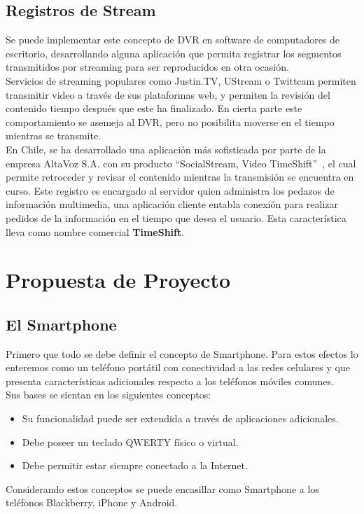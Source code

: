 \subsection{Registros de Stream}

Se puede implementar este concepto de DVR en software de computadores de escritorio, desarrollando alguna aplicación que permita registrar los segmentos transmitidos por streaming para ser reproducidos en otra ocasión. \\

	Servicios de streaming populares como Justin.TV, UStream o Twittcam permiten transmitir video a través de sus plataformas web, y permiten la revisión del contenido tiempo después que este ha finalizado. En cierta parte este comportamiento se asemeja al DVR, pero no posibilita moverse en el tiempo mientras se transmite.\\

En Chile, se ha desarrollado una aplicación más sofisticada por parte de la empresa AltaVoz S.A. con su producto \textquotedblleft SocialStream, Video TimeShift\textquotedblright \ \cite{sota:altavoz-socialstream}, el cual permite retroceder y revisar el contenido mientras la transmisión se encuentra en curso. Este registro es encargado al servidor quien administra los pedazos de información multimedia, una aplicación cliente entabla conexión para realizar pedidos de la información en el tiempo que desea el usuario.
Esta característica lleva como nombre comercial \textbf{TimeShift}.

\section{Propuesta de Proyecto}
\subsection{El Smartphone}
Primero que todo se debe definir el concepto de Smartphone. Para estos efectos lo enteremos como un teléfono portátil con conectividad a las redes celulares y que presenta características adicionales respecto a los teléfonos móviles comunes.\\

Sus bases se sientan en los siguientes conceptos:
\begin{itemize}
\item Su funcionalidad puede ser extendida a través de aplicaciones adicionales.
\item Debe poseer un teclado QWERTY físico o virtual.
\item Debe permitir estar siempre conectado a la Internet.
\end{itemize}
Considerando estos conceptos se puede encasillar como Smartphone a los teléfonos Blackberry, iPhone y Android.

